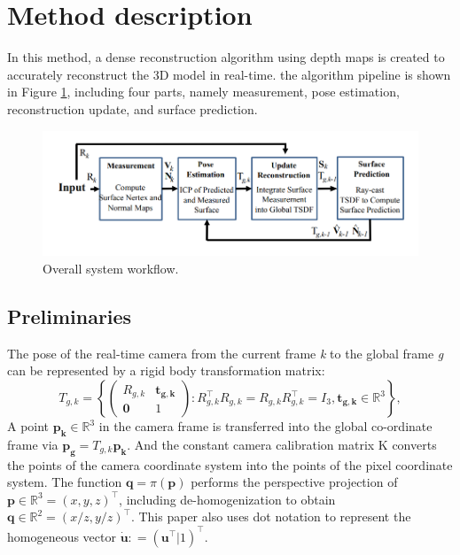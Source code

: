 \documentclass[a4paper,12pt]{article}
\begin{document}
\section{Method description}
In this method, a dense reconstruction algorithm using depth maps is created to accurately reconstruct the 3D model in real-time. 
the algorithm pipeline is shown in Figure \ref{figure1}, 
including four parts, namely measurement, pose estimation, reconstruction update, and surface prediction.
\begin{figure}[h] %
    \centering %
    \includegraphics[scale=0.5]{figure1.png} %
    \caption{Overall system workflow\cite{6162880}.} %
    \label{figure1} %
\end{figure}%

\subsection{Preliminaries}
The pose of the real-time camera from the current frame \textit{k} to the global frame \textit{g} can be represented by a rigid body transformation matrix:
\begin{equation}
	T_{g,k} = \left\{
	\begin{pmatrix}
	R_{g,k} & \mathbf{t_{g,k}} \\ \mathbf{0} & 1
	\end{pmatrix}
	:
	R_{g,k}^\top R_{g,k} = R_{g,k} R_{g,k}^\top = I_3, \mathbf{t_{g,k}}\in\mathbb{R}^3
	\right\},
	\label{equ1}
	\end{equation}
A point $ \mathbf{p_k}\in\mathbb{R}^3 $ in the camera frame is transferred into the global co-ordinate frame via $ \mathbf{p_g}=T_{g,k}\mathbf{p_k}$.
And the constant camera calibration matrix K converts the points of the camera coordinate system into the points of the pixel coordinate system.
The function $\mathbf{q}=\pi(\mathbf{p})$ performs the perspective projection of $\mathbf{p}\in\mathbb{R}^3=(x,y,z)^\top$, including de-homogenization to obtain $\mathbf{q}\in\mathbb{R}^2=(x/z,y/z)^\top$. 
This paper also uses dot notation to represent the homogeneous vector $\dot{\mathbf{u}}: =(\mathbf{u}^\top | 1)^\top$\cite{6162880}.
\end{document}
